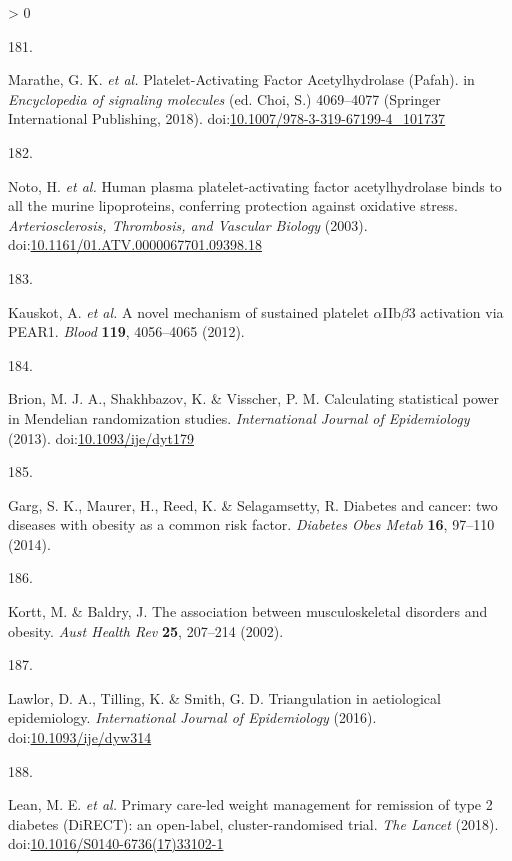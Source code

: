 \documentclass[11pt,twoside]{bristolthesis}
\newlength{\cslhangindent}
\newlength{\csllabelwidth}
\newenvironment{CSLReferences}[2] %
 {%
  \setlength{\parindent}{0pt}
  \ifodd #1 \everypar{\setlength{\hangindent}{\cslhangindent}}\ignorespaces\fi
  \ifnum #2 > 0
  \setlength{\parskip}{#2\baselineskip}
  \fi
 }%
 {}
\newcommand{\CSLLeftMargin}[1]{\parbox[t]{\csllabelwidth}{#1}}
\newcommand{\CSLRightInline}[1]{\parbox[t]{\linewidth - \csllabelwidth}{#1}\break}
\begin{document}
\begin{CSLReferences}{0}{0}
\leavevmode\hypertarget{ref-Marathe2018}{}%
\CSLLeftMargin{181. }
\CSLRightInline{Marathe, G. K. \emph{et al.} {Platelet-Activating Factor Acetylhydrolase (Pafah)}. in \emph{Encyclopedia of signaling molecules} (ed. Choi, S.) 4069--4077 (Springer International Publishing, 2018). doi:\href{https://doi.org/10.1007/978-3-319-67199-4_101737}{10.1007/978-3-319-67199-4\_101737}}

\leavevmode\hypertarget{ref-Noto2003}{}%
\CSLLeftMargin{182. }
\CSLRightInline{Noto, H. \emph{et al.} {Human plasma platelet-activating factor acetylhydrolase binds to all the murine lipoproteins, conferring protection against oxidative stress}. \emph{Arteriosclerosis, Thrombosis, and Vascular Biology} (2003). doi:\href{https://doi.org/10.1161/01.ATV.0000067701.09398.18}{10.1161/01.ATV.0000067701.09398.18}}

\leavevmode\hypertarget{ref-Kauskot2012}{}%
\CSLLeftMargin{183. }
\CSLRightInline{Kauskot, A. \emph{et al.} {A novel mechanism of sustained platelet \(\alpha\)IIb\(\beta\)3 activation via PEAR1.} \emph{Blood} \textbf{119}, 4056--4065 (2012).}

\leavevmode\hypertarget{ref-Brion2013}{}%
\CSLLeftMargin{184. }
\CSLRightInline{Brion, M. J. A., Shakhbazov, K. \& Visscher, P. M. {Calculating statistical power in Mendelian randomization studies}. \emph{International Journal of Epidemiology} (2013). doi:\href{https://doi.org/10.1093/ije/dyt179}{10.1093/ije/dyt179}}

\leavevmode\hypertarget{ref-Garg2014}{}%
\CSLLeftMargin{185. }
\CSLRightInline{Garg, S. K., Maurer, H., Reed, K. \& Selagamsetty, R. {Diabetes and cancer: two diseases with obesity as a common risk factor}. \emph{Diabetes Obes Metab} \textbf{16}, 97--110 (2014).}

\leavevmode\hypertarget{ref-Kortt2002}{}%
\CSLLeftMargin{186. }
\CSLRightInline{Kortt, M. \& Baldry, J. {The association between musculoskeletal disorders and obesity}. \emph{Aust Health Rev} \textbf{25}, 207--214 (2002).}

\leavevmode\hypertarget{ref-Lawlor2016}{}%
\CSLLeftMargin{187. }
\CSLRightInline{Lawlor, D. A., Tilling, K. \& Smith, G. D. {Triangulation in aetiological epidemiology}. \emph{International Journal of Epidemiology} (2016). doi:\href{https://doi.org/10.1093/ije/dyw314}{10.1093/ije/dyw314}}

\leavevmode\hypertarget{ref-Lean2018}{}%
\CSLLeftMargin{188. }
\CSLRightInline{Lean, M. E. \emph{et al.} {Primary care-led weight management for remission of type 2 diabetes (DiRECT): an open-label, cluster-randomised trial}. \emph{The Lancet} (2018). doi:\href{https://doi.org/10.1016/S0140-6736(17)33102-1}{10.1016/S0140-6736(17)33102-1}}


\end{CSLReferences}
\end{document}
